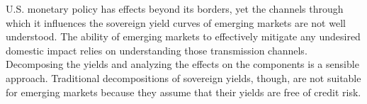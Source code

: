 U.S. monetary policy has effects beyond its borders, yet the channels through which it influences the sovereign yield curves of emerging markets are not well understood.
The ability of %
emerging markets
to effectively mitigate any undesired domestic impact relies on understanding those transmission channels.
Decomposing the yields and analyzing the effects on the components is a sensible approach.
Traditional decompositions of sovereign yields, though, are not suitable for emerging markets because they assume that their yields are free of credit risk. %





